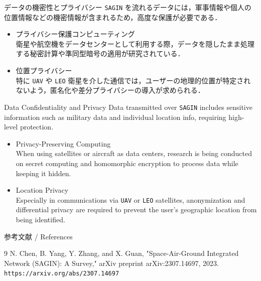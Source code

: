 \documentclass[11pt, aspectratio=169]{beamer}
\begin{document}
\begin{frame}[c]{データの機密性とプライバシー}
  \texttt{SAGIN} を流れるデータには，軍事情報や個人の位置情報などの機密情報が含まれるため，高度な保護が必要である．

  \vspace{1.5em}

  \begin{itemize}
    \item プライバシー保護コンピューティング \\
      衛星や航空機をデータセンターとして利用する際，データを隠したまま処理する秘密計算や準同型暗号の適用が研究されている．
      
    \vspace{1em}
    
    \item 位置プライバシー \\
      特に \texttt{UAV} や \texttt{LEO} 衛星を介した通信では，ユーザーの地理的位置が特定されないよう，匿名化や差分プライバシーの導入が求められる．
  \end{itemize}
\end{frame}

\begin{frame}[c]{Data Confidentiality and Privacy}
  Data transmitted over \texttt{SAGIN} includes sensitive information such as military data and individual location info, requiring high-level protection.

  \vspace{1.5em}

  \begin{itemize}
    \item Privacy-Preserving Computing \\
      When using satellites or aircraft as data centers, research is being conducted on secret computing and homomorphic encryption to process data while keeping it hidden.

    \vspace{1em}

    \item Location Privacy \\
      Especially in communications via \texttt{UAV} or \texttt{LEO} satellites, anonymization and differential privacy are required to prevent the user's geographic location from being identified.
  \end{itemize}
\end{frame}

\begin{frame}[c]{参考文献 / References}
  \begin{thebibliography}{9}
      N. Chen, B. Yang, Y. Zhang, and X. Guan,
      "Space-Air-Ground Integrated Network (SAGIN): A Survey,"
      arXiv preprint arXiv:2307.14697, 2023. \\
      \texttt{https://arxiv.org/abs/2307.14697}
  \end{thebibliography}
\end{frame}
\end{document}
